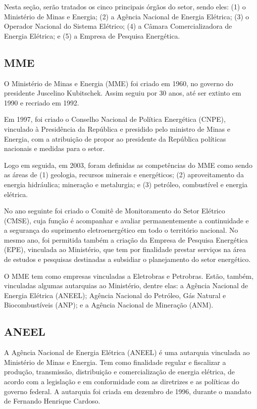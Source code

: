 \documentclass[grad,numbers]{coppe}
\begin{document}
  Nesta seção, serão tratados os cinco principais órgãos do setor, sendo eles: (1) o Ministério de Minas e Energia; (2) a Agência Nacional de Energia Elétrica; (3) o Operador Nacional do Sistema Elétrico; (4) a Câmara Comercializadora de Energia Elétrica; e (5) a Empresa de Pesquisa Energética.
  
  \hypertarget{mme}{%
  \subsection{MME}\label{mme}}
  
  O Ministério de Minas e Energia (MME) foi criado em 1960, no governo do presidente Juscelino Kubitschek. Assim seguiu por 30 anos, até ser extinto em 1990 e recriado em 1992.
  
  Em 1997, foi criado o Conselho Nacional de Política Energética (CNPE), vinculado à Presidência da República e presidido pelo ministro de Minas e Energia, com a atribuição de propor ao presidente da República políticas nacionais e medidas para o setor.
  
  Logo em seguida, em 2003, foram definidas as competências do MME como sendo as áreas de (1) geologia, recursos minerais e energéticos; (2) aproveitamento da energia hidráulica; mineração e metalurgia; e (3) petróleo, combustível e energia elétrica.
  
  No ano seguinte foi criado o Comitê de Monitoramento do Setor Elétrico (CMSE), cuja função é acompanhar e avaliar permanentemente a continuidade e a segurança do suprimento eletroenergético em todo o território nacional. No mesmo ano, foi permitida também a criação da Empresa de Pesquisa Energética (EPE), vinculada ao Ministério, que tem por finalidade prestar serviços na área de estudos e pesquisas destinadas a subsidiar o planejamento do setor energético.
  
  O MME tem como empresas vinculadas a Eletrobras e Petrobras. Estão, também, vinculadas algumas autarquias ao Ministério, dentre elas: a Agência Nacional de Energia Elétrica (ANEEL); Agência Nacional do Petróleo, Gás Natural e Biocombustíveis (ANP); e a Agência Nacional de Mineração (ANM).
  
  \hypertarget{aneel}{%
  \subsection{ANEEL}\label{aneel}}
  
  A Agência Nacional de Energia Elétrica (ANEEL) é uma autarquia vinculada ao Ministério de Minas e Energia. Tem como finalidade regular e fiscalizar a produção, transmissão, distribuição e comercialização de energia elétrica, de acordo com a legislação e em conformidade com as diretrizes e as políticas do governo federal. A autarquia foi criada em dezembro de 1996, durante o mandato de Fernando Henrique Cardoso.
  
\end{document}
